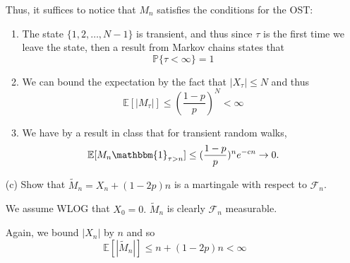 \documentclass[11pt]{article}
\newcommand{\bbE}{\mathbb{E}}
\newcommand{\bbP}{\mathbb{P}}
\begin{document}
\begin{itemize}
\begin{solution}
        Thus, it suffices to notice that $M_n$ satisfies the conditions for the OST:
        \begin{enumerate}
            \item The state $\{1,2,\dots, N-1\}$ is transient, and thus since $\tau$ is the first time we leave the state, then a result from Markov chains states that
            \[\bbP\{\tau  < \infty\} =1 \]
            \item We can bound the expectation by the fact that $|X_\tau|\leq N$ and thus
            \[\bbE[|M_\tau|] \leq \left( \frac{1-p}{p}\right)^N < \infty\]
            \item We have by a result in class that for transient random walks,
            \[\bbE[M_n \mathbbm{1}_{\tau > n}] \leq (\frac{1-p}{p})^ne^{-cn} \to 0.\]

        \end{enumerate}
    \end{solution}
    \item[(c)] Show that \(\widetilde{M}_n = X_n + (1 - 2p)n\) is a martingale with respect to \(\mathcal{F}_n\).
    \begin{solution} We assume WLOG that $X_0 = 0.$
        $\widetilde{M}_n$ is clearly $\mathcal{F}_n$ measurable.

        Again, we bound $|X_n|$ by $n$ and so 
        \[\bbE[|\widetilde{M}_n|] \leq n + (1-2p)n < \infty\]


\end{solution}
\end{itemize}
\end{document}
